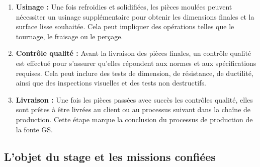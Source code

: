 \documentclass[12pt]{article}
\begin{document}
\begin{enumerate}
    \item \textbf{Usinage :} Une fois refroidies et solidifiées, les pièces moulées 
    peuvent nécessiter un usinage supplémentaire pour obtenir les dimensions finales 
    et la surface lisse souhaitée. Cela peut impliquer des opérations telles que le 
    tournage, le fraisage ou le perçage.
    
    \item \textbf{Contrôle qualité :} Avant la livraison des pièces finales, un 
    contrôle qualité est effectué pour s'assurer qu'elles répondent aux normes et 
    aux spécifications requises. Cela peut inclure des tests de dimension, de 
    résistance, de ductilité, ainsi que des inspections visuelles et des tests non 
    destructifs.
    
    \item \textbf{Livraison :} Une fois les pièces passées avec succès les contrôles 
    qualité, elles sont prêtes à être livrées au client ou au processus suivant dans 
    la chaîne de production. Cette étape marque la conclusion du processus de 
    production de la fonte GS.
\end{enumerate}




\subsection{L'objet du stage et les missions confiées }



\end{document}
